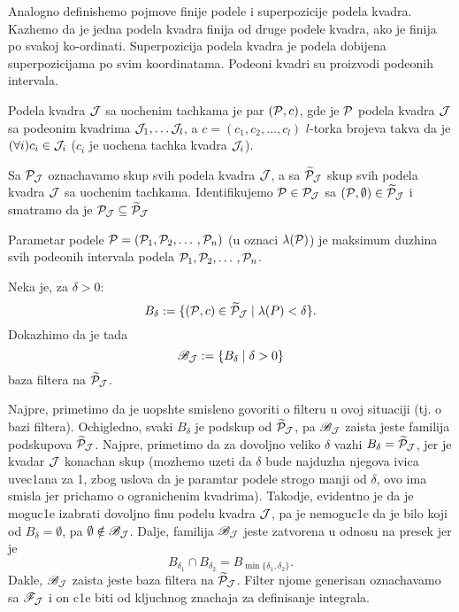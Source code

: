 \documentclass[../main.tex]{subfiles}
\begin{document}
    Analogno definishemo pojmove finije podele i superpozicije podela kvadra. Kazhemo da je jedna podela kvadra finija od druge podele kvadra, ako je \zn finija po svakoj ko-ordinati\zng. 
    Superpozicija podela kvadra je podela dobijena superpozicijama \zn po svim koordinatama\zng. Podeoni kvadri su proizvodi podeonih intervala.

    \begin{de}
    	Podela kvadra $\mathcal{J}$ sa uochenim tachkama je par $(\mathcal{P},c)$, gde je $\mathcal{P}$ podela kvadra $\mathcal{J}$ sa podeonim kvadrima $\mathcal{J}_1,\dotso\mathcal{J}_l$,
	a $c=(c_1,c_2,\dotso,c_l)$ $l$-torka brojeva takva da je $(\forall i)c_i\in\mathcal{J}_i$ ($c_i$ je uochena tachka kvadra $\mathcal{J}_i$).
    \end{de}

    Sa $\mathcal{P}_\mathcal{J}$ oznachavamo skup svih podela kvadra $\mathcal{J}$, a sa $\widetilde{\mathcal{P}}_\mathcal{J}$ skup svih podela kvadra $\mathcal{J}$ sa uochenim tachkama.
    Identifikujemo $\mathcal{P}\in \mathcal{P}_\mathcal{J}$ sa $(\mathcal{P},\emptyset)\in \widetilde{\mathcal{P}}_\mathcal{J}$ i smatramo da je $\mathcal{P}_\mathcal{J}\subseteq\widetilde{\mathcal{P}}_\mathcal{J}$
    
    \begin{de}
    	Parametar podele $\mathcal{P}=(\mathcal{P}_1,\mathcal{P}_2,\dotso, \mathcal{P}_n)$ (u oznaci $\lambda(\mathcal{P})$) je maksimum duzhina svih podeonih intervala podela $\mathcal{P}_1,\mathcal{P}_2,\dotso, \mathcal{P}_n$.
    \end{de}

    Neka je, za $\delta>0$:
    \[B_\delta := \{(\mathcal{P},c)\in \widetilde{\mathcal{P}}_\mathcal{J}\mid \lambda(P)<\delta\}.\]
    Dokazhimo da je tada
    \[\mathscr{B}_\mathcal{J}:=\{B_\delta \mid \delta > 0\}\]
    baza filtera na $\widetilde{\mathcal{P}}_\mathcal{J}$. 

    Najpre, primetimo da je uopshte smisleno govoriti o filteru u ovoj situaciji (tj. o bazi filtera). Ochigledno, svaki $B_\delta$ je podskup od $\widetilde{\mathcal{P}}_{\mathcal{J}}$,
    pa $\mathscr{B}_{\mathcal{J}}$ zaista jeste familija podskupova $\widetilde{\mathcal{P}}_{\mathcal{J}}$. Najpre, primetimo da za dovoljno veliko $\delta$ vazhi $B_\delta=\widetilde{\mathcal{P}}_{\mathcal{J}}$, jer je 
    kvadar $\mathcal{J}$ konachan skup (mozhemo uzeti da $\delta$ bude najduzha njegova ivica uvec1ana za 1, zbog uslova da je paramtar podele strogo manji od $\delta$, ovo ima smisla
    jer prichamo o ogranichenim kvadrima). Takodje, evidentno je da je moguc1e izabrati \zn dovoljno finu podelu kvadra $\mathcal{J}$\zng, pa je nemoguc1e da je bilo koji od
    $B_\delta = \emptyset$, pa $\emptyset \notin \mathscr{B}_{\mathcal{J}}$. Dalje, familija $\mathscr{B}_{\mathcal{J}}$ jeste zatvorena u odnosu na presek jer je 
    \[B_{\delta_1}\cap B_{\delta_2}=B_{\min\{\delta_1,\delta_2\}}.\]
    Dakle, $\mathscr{B}_{\mathcal{J}}$  zaista jeste baza filtera na $\widetilde{\mathcal{P}}_\mathcal{J}$. Filter njome generisan oznachavamo sa $\mathscr{F}_{\mathcal{J}}$ i on c1e biti od kljuchnog znachaja za 
    definisanje integrala.
\end{document}
